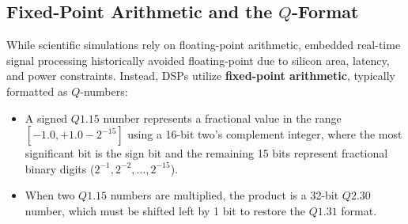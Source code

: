 \subsection{Fixed-Point Arithmetic and the $Q$-Format}
While scientific simulations rely on floating-point arithmetic, embedded real-time signal processing historically avoided floating-point due to silicon area, latency, and power constraints. Instead, DSPs utilize \textbf{fixed-point arithmetic}, typically formatted as $Q$-numbers:
\begin{itemize}
    \item A signed $Q1.15$ number represents a fractional value in the range $[-1.0, +1.0 - 2^{-15}]$ using a 16-bit two's complement integer, where the most significant bit is the sign bit and the remaining 15 bits represent fractional binary digits ($2^{-1}, 2^{-2}, \dots, 2^{-15}$).
    \item When two $Q1.15$ numbers are multiplied, the product is a 32-bit $Q2.30$ number, which must be shifted left by 1 bit to restore the $Q1.31$ format.
\end{itemize}

